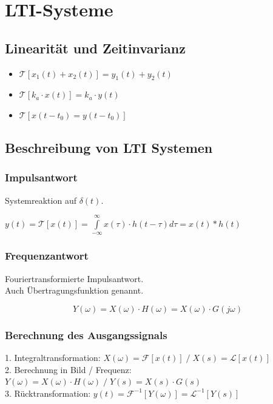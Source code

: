 \section{LTI-Systeme}
\begin{minipage}{0.5\textwidth}

    \subsection*{Linearität und Zeitinvarianz}
    \begin{itemize}
        \item $\mathcal{T}[x_1(t) + x_2(t)] = y_1(t) + y_2(t)$
        \item $\mathcal{T}[k_a \cdot x(t)] = k_a \cdot y(t)$
        \item $\mathcal{T}[x(t-t_0) = y(t-t_0)]$
    \end{itemize}

    \subsection{Beschreibung von LTI Systemen}

    \subsubsection{Impulsantwort}
    Systemreaktion auf $\delta(t)$.

    $ y(t) = \mathcal{T}[x(t)]
        = \int \limits _{-\infty} ^{\infty} x(\tau) \cdot h(t-\tau)d\tau
        = x(t) * h(t)$

    \subsubsection{Frequenzantwort}
    Fouriertransformierte Impulsantwort.
    \\ Auch Übertragungsfunktion genannt.

    $$ Y(\omega) = X(\omega) \cdot H(\omega) = X(\omega) \cdot G(j\omega)$$

    \subsubsection{Berechnung des Ausgangssignals}
    1. Integraltransformation:
    \newline $X(\omega) = \mathcal{F}[x(t)] {\; \big / \;}
        X(s) = \mathscr{L}[x(t)]$ \\
    2. Berechnung in Bild / Frequenz:
    \newline $Y(\omega) = X(\omega) \cdot H(\omega)  {\; \big / \;}
        Y(s) = X(s) \cdot G(s)$ \\
    3. Rücktransformation:
    \newline $y(t) = \mathcal{F}^{-1}[Y(\omega)] = \mathscr{L}^{-1}[Y(s)]$

\end{minipage}%
